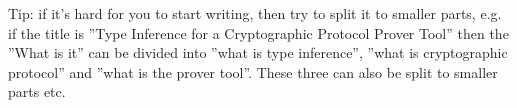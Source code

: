 \documentclass[..thesis.tex]{subfiles}
\begin{document}


Tip: if it's hard for you to start writing, then try to split it to smaller parts, e.g. if the title is ''Type Inference for a Cryptographic Protocol Prover Tool'' then the ''What is it'' can be divided into ''what is type inference'', ''what is cryptographic protocol'' and ''what is the prover tool''. These three can also be split to smaller parts etc.
\end{document}
